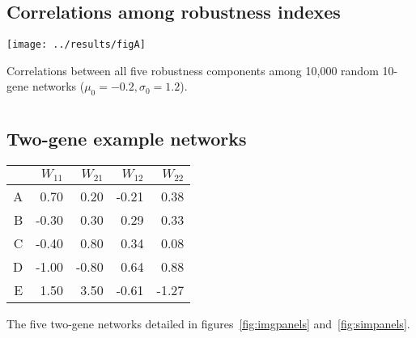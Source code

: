 \documentclass[a4paper]{article}
\begin{document}
\printbibliography




\clearpage



\begin{appendices}
  \setcounter{section}{0}
  \renewcommand{\thesection}{\arabic{section}}

  \clearpage
  \section{}
    \label{supp:fullcorr}
    \subsection*{Correlations among robustness indexes}

	\texttt{[image: ../results/figA]}
	
	Correlations between all five robustness components among 10,000 random 10-gene networks ($\mu_0=-0.2, \sigma_0=1.2$). 



  \clearpage
  \section{}
    \label{supp:W}
    \subsection*{Two-gene example networks}

	\begin{center}
	\begin{tabular}{rrrrr}
	  \hline
	 & $W_{11}$ & $W_{21}$ & $W_{12}$ & $W_{22}$ \\ 
	  \hline
	  A & 0.70 & 0.20 & -0.21 & 0.38 \\ 
	  B & -0.30 & 0.30 & 0.29 & 0.33 \\ 
	  C & -0.40 & 0.80 & 0.34 & 0.08 \\ 
	  D & -1.00 & -0.80 & 0.64 & 0.88 \\ 
	  E & 1.50 & 3.50 & -0.61 & -1.27 \\ 
	   \hline
	\end{tabular}
	\end{center}
	
	The five two-gene networks detailed in figures~\ref{fig:imgpanels} and~\ref{fig:simpanels}.

  \clearpage
  \section{}
    \label{supp:whyitfails}

\end{appendices}
\end{document}
